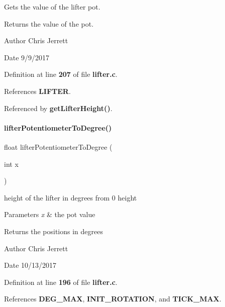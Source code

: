 Gets the value of the lifter pot. 

\begin{DoxyReturn}{Returns}
the value of the pot. 
\end{DoxyReturn}
\begin{DoxyAuthor}{Author}
Chris Jerrett 
\end{DoxyAuthor}
\begin{DoxyDate}{Date}
9/9/2017 
\end{DoxyDate}


Definition at line \textbf{ 207} of file \textbf{ lifter.\+c}.



References \textbf{ L\+I\+F\+T\+ER}.



Referenced by \textbf{ get\+Lifter\+Height()}.

\mbox{\label{lifter_8c_ab0460888f3213e5510bd25ae1e152a75}} 
\paragraph{lifter\+Potentiometer\+To\+Degree()}
{\footnotesize\ttfamily float lifter\+Potentiometer\+To\+Degree (\begin{DoxyParamCaption}\item[{int}]{x }\end{DoxyParamCaption})}



height of the lifter in degrees from 0 height 


\begin{DoxyParams}{Parameters}
{\em x} & the pot value \\
\hline
\end{DoxyParams}
\begin{DoxyReturn}{Returns}
the positions in degrees 
\end{DoxyReturn}
\begin{DoxyAuthor}{Author}
Chris Jerrett 
\end{DoxyAuthor}
\begin{DoxyDate}{Date}
10/13/2017 
\end{DoxyDate}


Definition at line \textbf{ 196} of file \textbf{ lifter.\+c}.



References \textbf{ D\+E\+G\+\_\+\+M\+AX}, \textbf{ I\+N\+I\+T\+\_\+\+R\+O\+T\+A\+T\+I\+ON}, and \textbf{ T\+I\+C\+K\+\_\+\+M\+AX}.

